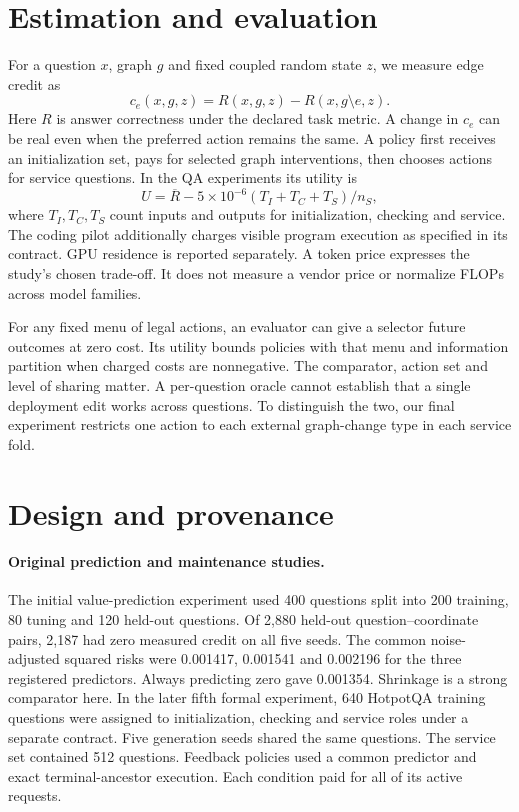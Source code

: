 \documentclass[11pt]{article}
\begin{document}
\section{Estimation and evaluation}
For a question $x$, graph $g$ and fixed coupled random state $z$, we measure edge credit as
\begin{equation}
 c_e(x,g,z)=R(x,g,z)-R(x,g\setminus e,z).
\end{equation}
Here $R$ is answer correctness under the declared task metric. A change in $c_e$ can be real even when the preferred action remains the same. A policy first receives an initialization set, pays for selected graph interventions, then chooses actions for service questions. In the QA experiments its utility is
\begin{equation}
 U=\overline R-5\!\times\!10^{-6}(T_I+T_C+T_S)/n_S,
\end{equation}
where $T_I,T_C,T_S$ count inputs and outputs for initialization, checking and service. The coding pilot additionally charges visible program execution as specified in its contract. GPU residence is reported separately. A token price expresses the study's chosen trade-off. It does not measure a vendor price or normalize FLOPs across model families.

For any fixed menu of legal actions, an evaluator can give a selector future outcomes at zero cost. Its utility bounds policies with that menu and information partition when charged costs are nonnegative. The comparator, action set and level of sharing matter. A per-question oracle cannot establish that a single deployment edit works across questions. To distinguish the two, our final experiment restricts one action to each external graph-change type in each service fold.

\section{Design and provenance}
\paragraph{Original prediction and maintenance studies.} The initial value-prediction experiment used 400 questions split into 200 training, 80 tuning and 120 held-out questions. Of 2,880 held-out question--coordinate pairs, 2,187 had zero measured credit on all five seeds. The common noise-adjusted squared risks were 0.001417, 0.001541 and 0.002196 for the three registered predictors. Always predicting zero gave 0.001354. Shrinkage is a strong comparator here. In the later fifth formal experiment, 640 HotpotQA training questions were assigned to initialization, checking and service roles under a separate contract. Five generation seeds shared the same questions. The service set contained 512 questions. Feedback policies used a common predictor and exact terminal-ancestor execution. Each condition paid for all of its active requests.
\end{document}
